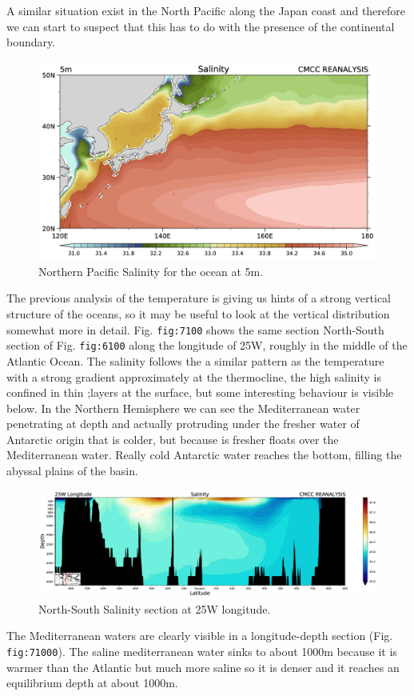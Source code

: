 A similar situation exist in the North Pacific along the Japan coast and
therefore we can start to suspect that this has to do with the presence
of the continental boundary.

\begin{figure}
	\centering
	\includegraphics[width = .7 \textwidth]{figs/GD/SKur5.png}
	\caption{Northern Pacific Salinity for the ocean at 5m.}
\end{figure}

The previous analysis of the temperature is giving us hints of a strong
vertical structure of the oceans, so it may be useful to look at the
vertical distribution somewhat more in detail. Fig. \texttt{fig:7100}
shows the same section North-South section of Fig. \texttt{fig:6100}
along the longitude of 25W, roughly in the middle of the Atlantic Ocean.
The salinity follows the a similar pattern as the temperature with a
strong gradient approximately at the thermocline, the high salinity is
confined in thin ;layers at the surface, but some interesting behaviour
is visible below. In the Northern Hemisphere we can see the
Mediterranean water penetrating at depth and actually protruding under
the fresher water of Antarctic origin that is colder, but because is
fresher floats over the Mediterranean water. Really cold Antarctic water
reaches the bottom, filling the abyssal plains of the basin.

\begin{figure}
	\centering
	\includegraphics[width = .7 \textwidth]{figs/GD/SectSal25W5000.png}
	\caption{North-South Salinity section at 25W longitude.}
\end{figure}

The Mediterranean waters are clearly visible in a longitude-depth
section (Fig. \texttt{fig:71000}). The saline mediterranean water sinks
to about 1000m because it is warmer than the Atlantic but much more
saline so it is denser and it reaches an equilibrium depth at about
1000m.


